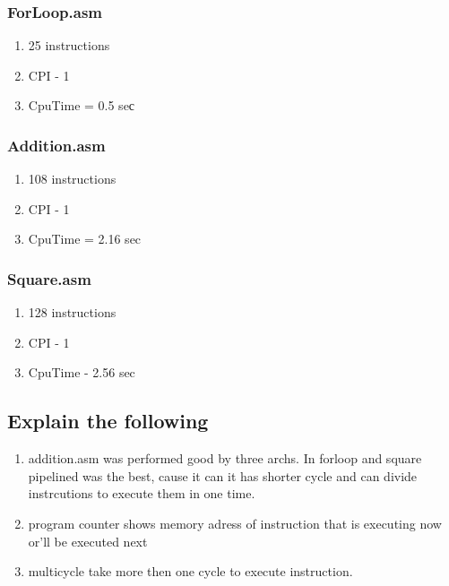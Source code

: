 \documentclass[10pt]{article}
\begin{document}
        \subsubsection{ForLoop.asm}
        \begin{enumerate}
            \item 25 instructions
            \item CPI - 1
            \item CpuTime = 0.5 seс
        \end{enumerate}
        \subsubsection{Addition.asm}
        \begin{enumerate}
            \item 108 instructions
            \item CPI - 1
            \item CpuTime = 2.16 sec
        \end{enumerate}
        \subsubsection{Square.asm}
        \begin{enumerate}
            \item 128 instructions
            \item CPI - 1
            \item CpuTime - 2.56 sec            
        \end{enumerate}


\subsection{Explain the following}
    \begin{enumerate}
        \item addition.asm was performed good by three archs. In forloop and square pipelined was the best, cause it can it has shorter cycle and can divide instrcutions to execute them in one time.
        \item program counter shows memory adress of instruction that is executing now or'll be executed next
        \item multicycle take more then one cycle to execute instruction.
        \end{enumerate}
\end{document}
